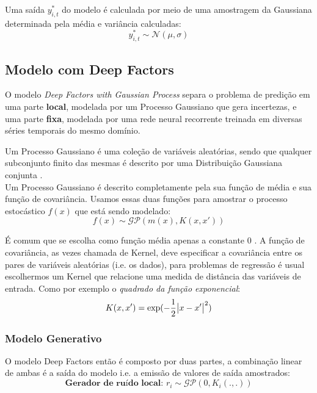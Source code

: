 Uma saída $y^*_{i,t}$ do modelo é calculada por meio de uma amostragem da Gaussiana determinada pela média e variância calculadas: \\

\[
 y^*_{i,t} \sim \mathcal{N}(\mu,\sigma) 
\]

\subsection{Modelo com Deep Factors}

O modelo \textit{Deep Factors with Gaussian Process} \citep{deepfactors} separa o problema de predição em uma parte \textbf{local}, modelada por um Processo Gaussiano que gera incertezas, e uma parte \textbf{fixa}, modelada por uma rede neural recorrente treinada em diversas séries temporais do mesmo domínio.


Um Processo Gaussiano é uma coleção de variáveis aleatórias,
sendo que qualquer subconjunto finito das mesmas é descrito por uma Distribuição Gaussiana conjunta \citep{gpml}. \\

Um Processo Gaussiano é descrito completamente pela sua função de média e sua função de covariância. Usamos essas duas funções para amostrar o processo estocástico $f(x)$ que está sendo modelado: \\

\[
f(x) \sim \mathcal{GP}( m(x), K(x,x'))
\]

É comum que se escolha como função média apenas a constante 0 \citep{gpml}.  A função de covariância, as vezes chamada de Kernel, deve especificar a covariância entre os pares de variáveis aleatórias (i.e. os dados), para problemas de regressão é usual escolhermos um Kernel que relacione uma medida de distância das variáveis de entrada. Como por exemplo o \textit{quadrado da função exponencial}: \\

\[
  K(x,x') = \exp(-\frac{1}{2}\abs{x - x'}^2)
\]


\subsubsection{Modelo Generativo}

O modelo Deep Factors então é composto por duas partes, a combinação linear de ambas é a saída do modelo i.e. a emissão de valores de saída amostrados: \\


\[
    \textbf{Gerador de ruído local: }  r_i \sim \mathcal{GP} (0, K_i(.,.))
\]


